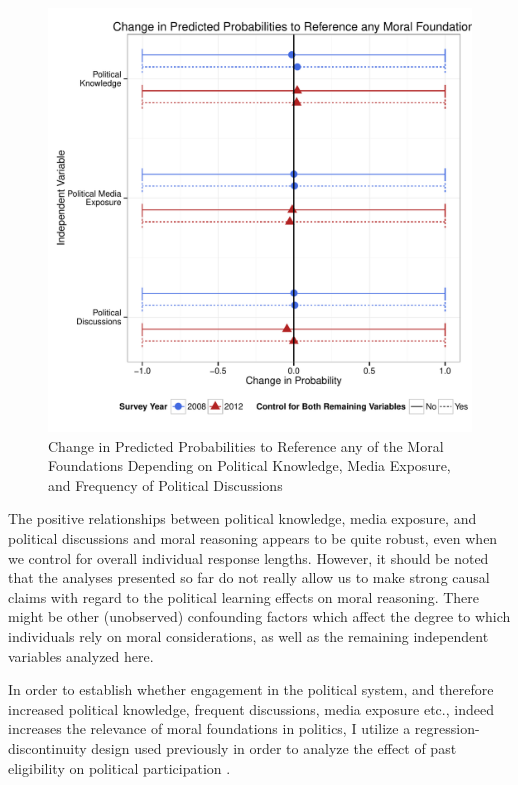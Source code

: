 \documentclass[12pt]{article}
\begin{document}
\begin{figure}\centering
\includegraphics[scale=.6]{../calc/fig/m3_learn.pdf}
\caption{Change in Predicted Probabilities to Reference any of the Moral Foundations Depending on Political Knowledge, Media Exposure, and Frequency of Political Discussions}\label{fig:m3_learn}
\end{figure}

The positive relationships between political knowledge, media exposure, and political discussions and moral reasoning appears to be quite robust, even when we control for overall individual response lengths. However, it should be noted that the analyses presented so far do not really allow us to make strong causal claims with regard to the political learning effects on moral reasoning. There might be other (unobserved) confounding factors which affect the degree to which individuals rely on moral considerations, as well as the remaining independent variables analyzed here.

In order to establish whether engagement in the political system, and therefore increased political knowledge, frequent discussions, media exposure etc., indeed increases the relevance of moral foundations in politics, I utilize a regression-discontinuity design used previously in order to analyze the effect of past eligibility on political participation \citep[see for example][]{meredith2009persistence}.
\end{document}
